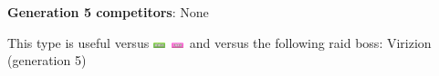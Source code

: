 \documentclass[8pt,aspectratio=169,compress]{beamer}
\newcommand{\fairyfull}{\includegraphics[height=0.15cm]{../../images/type/full/Fairy.png}}
\newcommand{\grassfull}{\includegraphics[height=0.15cm]{../../images/type/full/Grass.png}}
\begin{document}
\begin{frame}
\begin{tiny}
\begin{block}{}
\begin{center}
\textbf{Generation 5 competitors}: None
\end{center}
\end{block}

\begin{block}{}\begin{center}
This type is useful versus \grassfull~\fairyfull~and versus the following raid boss: Virizion (generation 5)
\end{center}
\end{block}

\end{tiny}
\end{frame}




\end{document}
